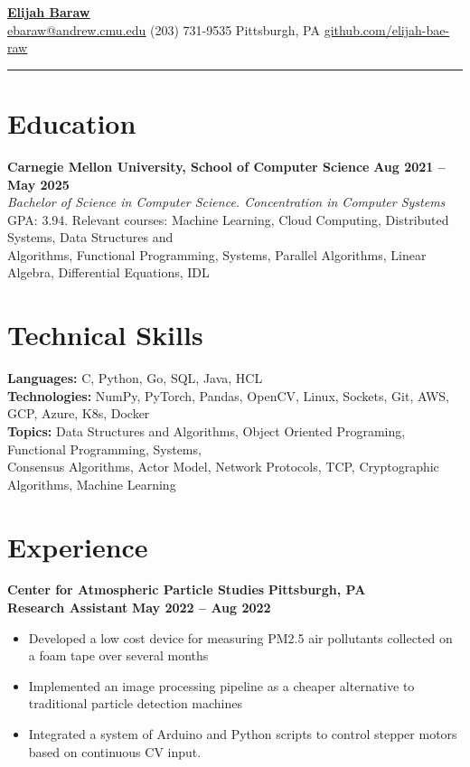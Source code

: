 \documentclass[fontsize=12pt]{scrartcl}
\let\oldhref\href
\renewcommand{\href}[2]{\textcolor{blue}{\underline{\oldhref{#1}{#2}}}}
\begin{document}
\begin{center}
    {\LARGE \textbf{\href{https://www.elijahbaraw.com/}{Elijah Baraw}}} \\
    \vspace{2pt}
    \large{\href{mailto:ebaraw@andrew.cmu.edu?subject=RE:\%20Your\%20Resume}{ebaraw@andrew.cmu.edu} \textbar\space(203) 731-9535 \textbar\space Pittsburgh, PA \textbar\space\href{https://github.com/elijah-bae-raw}{github.com/elijah-bae-raw}}
\end{center}
\vspace{-18pt}
\rule{\textwidth}{0.4pt}
\vspace{-18pt}

\section{Education}
\textbf{Carnegie Mellon University, School of Computer Science} \hfill \textbf{Aug 2021 -- May 2025} \\
\textit{Bachelor of Science in Computer Science. Concentration in Computer Systems} \\
GPA\@: 3.94. Relevant courses: Machine Learning, Cloud Computing, Distributed Systems, Data Structures and \\ Algorithms, Functional Programming, Systems, Parallel Algorithms, Linear Algebra, Differential Equations, IDL

\section{Technical Skills}
\textbf{Languages:} C, Python, Go, SQL, Java, HCL \\
\textbf{Technologies:} NumPy, PyTorch, Pandas, OpenCV, Linux, Sockets, Git, AWS, GCP, Azure, K8s, Docker \\
\textbf{Topics:} Data Structures and Algorithms, Object Oriented Programing, Functional Programming, Systems, \\Consensus Algorithms, Actor Model, Network Protocols, TCP, Cryptographic Algorithms, Machine Learning

\section{Experience}
{\large\textbf{Center for Atmospheric Particle Studies}} \hfill \textbf{Pittsburgh, PA} \\
\textbf{Research Assistant} \hfill \textbf{May 2022 -- Aug 2022}
\begin{itemize}
    \item Developed a low cost device for measuring PM2.5 air pollutants collected on a foam tape over several months
    \item Implemented an image processing pipeline as a cheaper alternative to traditional particle detection machines
    \item Integrated a system of Arduino and Python scripts to control stepper motors based on continuous CV input.
\end{itemize}
\end{document}
